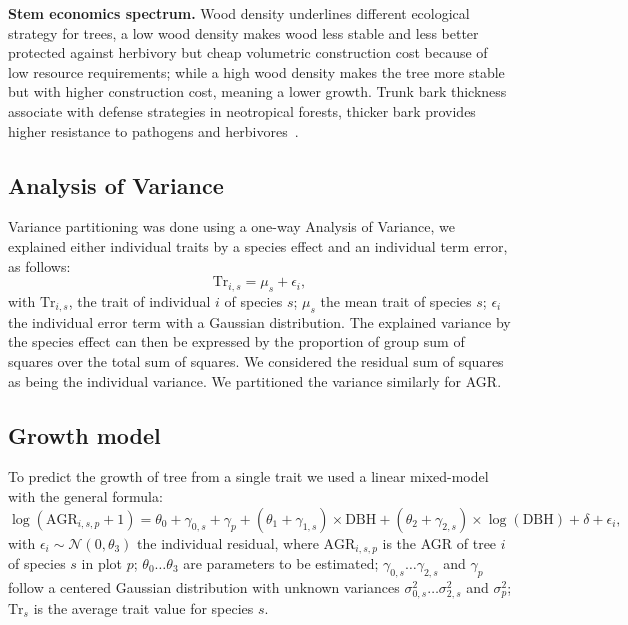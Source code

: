 \textbf{Stem economics spectrum.} Wood density underlines different ecological strategy for trees, a low wood density makes wood less stable and less better protected against herbivory but cheap volumetric construction cost because of low resource requirements; while a high wood density makes the tree more stable but with higher construction cost, meaning a lower growth. Trunk bark thickness associate with defense strategies in neotropical forests, thicker bark provides higher resistance to pathogens and herbivores~\cite{NEEDED}.

\subsection*{Analysis of Variance}
Variance partitioning was done using a one-way Analysis of Variance, we explained either individual traits by a species effect and an individual term error, as follows:
\begin{equation}
	\label{eq:anova}
	\text{Tr}_{i,s} = \mu_s + \epsilon_i,
\end{equation}
with $\text{Tr}_{i,s}$, the trait of individual $i$ of species $s$; $\mu_s$ the mean trait of species $s$; $\epsilon_i$ the individual error term with a Gaussian distribution. The explained variance by the species effect can then be expressed by the proportion of group sum of squares over the total sum of squares. We considered the residual sum of squares as being the individual variance. We partitioned the variance similarly for AGR.

\subsection*{Growth model}

To predict the growth of tree from a single trait we used a linear mixed-model with the general formula:
\begin{equation}
	\label{eq:growth_mod}
	\log(\text{AGR}_{i, s, p} + 1) = \theta_0 + \gamma_{0, s} + \gamma_p
		+ (\theta_1 + \gamma_{1, s}) \times \text{DBH}
		+ (\theta_2 + \gamma_{2, s}) \times \log(\text{DBH})
		+ \delta
		+ \epsilon_i,
\end{equation}
with $\epsilon_i \sim \mathcal{N}(0, \theta_3)$ the individual residual,
where $\text{AGR}_{i, s, p}$ is the AGR of tree $i$ of species $s$ in plot $p$; $\theta_0 \ldots \theta_3$ are parameters to be estimated; $\gamma_{0, s} \ldots \gamma_{2, s}$ and $\gamma_p$ follow a centered Gaussian distribution with unknown variances $\sigma^2_{0, s} \ldots \sigma^2_{2, s}$ and $\sigma^2_p$; $\text{Tr}_s$ is the average trait value for species $s$.

